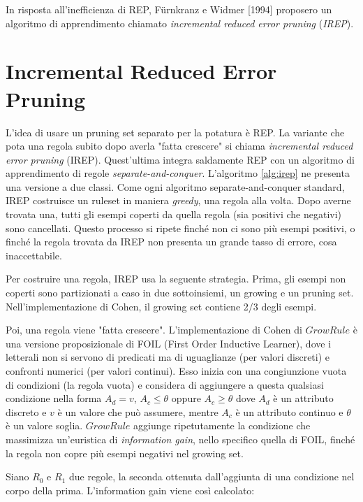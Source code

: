 In risposta all'inefficienza di REP, Fürnkranz e Widmer [1994] proposero un algoritmo di apprendimento chiamato \textit{incremental reduced error pruning} (\textit{IREP})\cite{Furnkranz94incrementalreduced}.

\section{Incremental Reduced Error Pruning}
L'idea di usare un pruning set separato per la potatura è REP. La variante che pota una regola subito dopo averla "fatta crescere" si chiama \textit{incremental reduced error pruning} (IREP)\cite{2Witten:2011:DMP:1972514}. Quest'ultima integra saldamente REP con un algoritmo di apprendimento di regole \textit{separate-and-conquer}. L'algoritmo \ref{alg:irep} ne presenta una versione a due classi. Come ogni algoritmo separate-and-conquer standard, IREP costruisce un ruleset in maniera \textit{greedy}, una regola alla volta. Dopo averne trovata una, tutti gli esempi coperti da quella regola (sia positivi che negativi) sono cancellati. Questo processo si ripete finché non ci sono più esempi positivi, o finché la regola trovata da IREP non presenta un grande tasso di errore, cosa inaccettabile.

Per costruire una regola, IREP usa la seguente strategia. Prima, gli esempi non coperti sono partizionati a caso in due sottoinsiemi, un growing e un pruning set. Nell'implementazione di Cohen, il growing set contiene 2/3 degli esempi.

Poi, una regola viene "fatta crescere". L'implementazione di Cohen di $GrowRule$ è una versione proposizionale di FOIL (First Order Inductive Learner), dove i letterali non si servono di predicati ma di uguaglianze (per valori discreti) e confronti numerici (per valori continui)\cite{Russell:2003:AIM:773294}. Esso inizia con una congiunzione vuota di condizioni (la regola vuota) e considera di aggiungere a questa qualsiasi condizione nella forma $A_d=v$, $A_c \leq \theta$ oppure $A_c \geq \theta$ dove $A_d$ è un attributo discreto e $v$ è un valore che può assumere, mentre $A_c$ è un attributo continuo e $\theta$ è un valore soglia. $GrowRule$ aggiunge ripetutamente la condizione che massimizza un'euristica di \emph{information gain}, nello specifico quella di FOIL, finché la regola non copre più esempi negativi nel growing set.

Siano $R_0$ e $R_1$ due regole, la seconda ottenuta dall'aggiunta di una condizione nel corpo della prima. L'information gain viene così calcolato:

